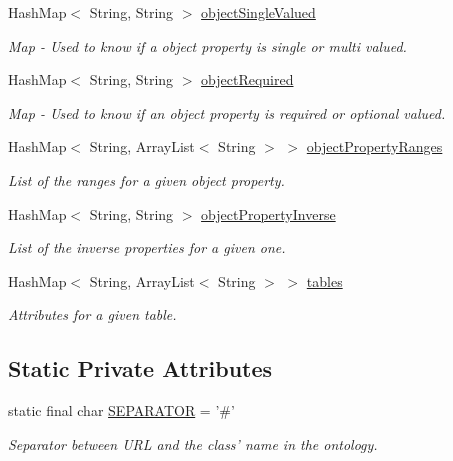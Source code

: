 \begin{DoxyCompactItemize}
HashMap$<$ String, String $>$ \hyperlink{class_data_base_1_1_tables_ae379376430f85d3c7cef16bf1a962ff1}{objectSingleValued}
\begin{DoxyCompactList}\small\item\em Map -\/ Used to know if a object property is single or multi valued. \end{DoxyCompactList}\item 
HashMap$<$ String, String $>$ \hyperlink{class_data_base_1_1_tables_a11874c966b0f22fc88b7fb46cb3331ed}{objectRequired}
\begin{DoxyCompactList}\small\item\em Map -\/ Used to know if an object property is required or optional valued. \end{DoxyCompactList}\item 
HashMap$<$ String, ArrayList$<$ String $>$ $>$ \hyperlink{class_data_base_1_1_tables_af580afd6f42aac3503cecab2e615ef73}{objectPropertyRanges}
\begin{DoxyCompactList}\small\item\em List of the ranges for a given object property. \end{DoxyCompactList}\item 
HashMap$<$ String, String $>$ \hyperlink{class_data_base_1_1_tables_a0465d81797980577fb423e6140df7110}{objectPropertyInverse}
\begin{DoxyCompactList}\small\item\em List of the inverse properties for a given one. \end{DoxyCompactList}\item 
HashMap$<$ String, ArrayList$<$ String $>$ $>$ \hyperlink{class_data_base_1_1_tables_ae6cd882f76e6474bd85b97b5013437ca}{tables}
\begin{DoxyCompactList}\small\item\em Attributes for a given table. \end{DoxyCompactList}\end{DoxyCompactItemize}
\subsection*{Static Private Attributes}
\begin{DoxyCompactItemize}
\item 
\hypertarget{class_data_base_1_1_tables_a7105339ab124b92dd2a47f67a497a556}{
static final char \hyperlink{class_data_base_1_1_tables_a7105339ab124b92dd2a47f67a497a556}{SEPARATOR} = '\#'}
\label{class_data_base_1_1_tables_a7105339ab124b92dd2a47f67a497a556}

\begin{DoxyCompactList}\small\item\em Separator between URL and the class' name in the ontology. \end{DoxyCompactList}\end{DoxyCompactItemize}


